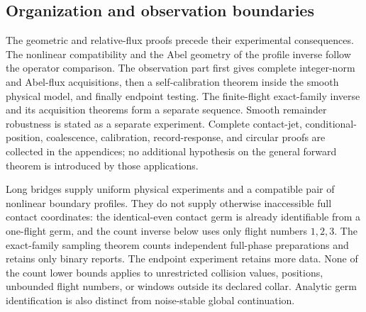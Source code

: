 \subsection{Organization and observation boundaries}
The geometric and relative-flux proofs precede their experimental
consequences. The nonlinear compatibility and the Abel geometry of the profile inverse
follow the operator comparison. The observation part first gives complete
integer-norm and Abel-flux acquisitions, then a self-calibration theorem
inside the smooth physical model, and finally endpoint testing. The
finite-flight exact-family inverse and its acquisition theorems form
a separate sequence. Smooth remainder robustness is stated as
a separate experiment. Complete contact-jet, conditional-position,
coalescence, calibration, record-response, and circular proofs are
collected in the appendices; no additional hypothesis on the general
forward theorem is introduced by those applications.

Long bridges supply uniform physical experiments and a compatible
pair of nonlinear boundary profiles. They do not supply otherwise
inaccessible full contact coordinates: the identical-even
contact germ is already identifiable from a one-flight germ, and the
count inverse below uses only flight numbers $1,2,3$. The exact-family
sampling theorem counts independent full-phase preparations and retains
only binary reports. The endpoint experiment retains more data. None of
the count lower bounds applies to unrestricted collision values,
positions, unbounded flight numbers, or windows outside its declared
collar. Analytic germ identification is also distinct from noise-stable
global continuation.

